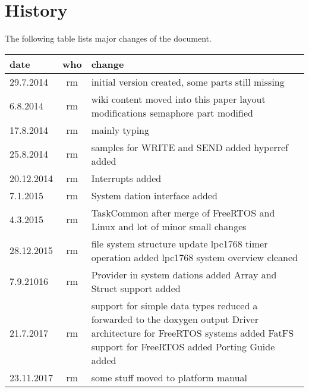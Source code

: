 \chapter*{History}
The following table lists major changes of the document.

\begin{tabular}{|l|c|p{10cm}|}
\hline
date & who & change \\
\hline
29.7.2014 & rm & initial version created, some parts still missing \\
6.8.2014 & rm & wiki content moved into this paper \newline
                layout modifications\newline
                semaphore part modified\\
17.8.2014 & rm & mainly typing \\
25.8.2014 & rm & samples for WRITE and SEND added \newline
		 hyperref added\\
20.12.2014 & rm & Interrupts added \\
7.1.2015 & rm & System dation interface added \\
4.3.2015 & rm &  TaskCommon after merge of FreeRTOS and Linux \newline
and lot of minor small changes \\
28.12.2015 & rm & file system structure update \newline
                  lpc1768 timer operation added \newline
                  lpc1768 system overview cleaned \\
7.9.21016 & rm & Provider in system dations added\newline
                 Array and Struct support added\\
21.7.2017 & rm & support for simple data types reduced
                 a forwarded to the doxygen output \newline
                 Driver architecture for FreeRTOS systems added \newline
                 FatFS support for FreeRTOS added \newline
                 Porting Guide added \\
23.11.2017 & rm & some stuff moved to platform manual\\
\hline
\end{tabular} 
